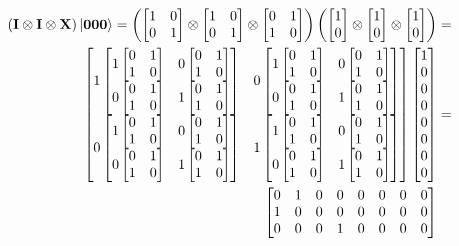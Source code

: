 \begin{figure}[H]
    \centering
    \begin{align*}
        \left(\qti\otimes\qti\otimes\qtx\right)\ket{\qtz\qtz\qtz}=\left(\qi\otimes\qi\otimes\qx\right)\left(\qz\otimes\qz\otimes\qz\right)&= \\
        \begin{bmatrix}
            1
            \begin{bmatrix}
                1 \qx & 0 \qx\\
                0 \qx & 1 \qx\\
            \end{bmatrix}
            & 0
            \begin{bmatrix}
                1 \qx & 0 \qx\\
                0 \qx & 1 \qx\\
            \end{bmatrix}\\
            0 
            \begin{bmatrix}
                1 \qx & 0 \qx\\
                0 \qx & 1 \qx\\
            \end{bmatrix}
            & 1
            \begin{bmatrix}
                1 \qx & 0 \qx\\
                0 \qx & 1 \qx\\
            \end{bmatrix}\\ 
        \end{bmatrix}
        \begin{bmatrix}
            1\\
            0\\
            0\\
            0\\
            0\\
            0\\
            0\\
            0
        \end{bmatrix}
        &=\\
        \begin{bmatrix}
            0 & 1 & 0 & 0 & 0 & 0 & 0 & 0\\
            1 & 0 & 0 & 0 & 0 & 0 & 0 & 0\\
            0 & 0 & 0 & 1 & 0 & 0 & 0 & 0\\

\end{bmatrix}
\end{align*}
\end{figure}
